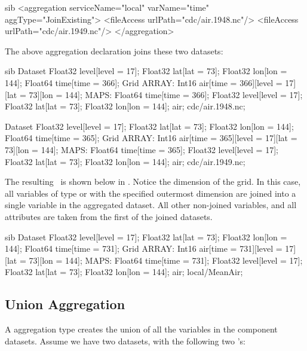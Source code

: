 \documentclass{dods-book}
\begin{document}
\begin{vcode}{sib}
<aggregation serviceName="local" varName="time" 
    aggType="JoinExisting">
  <fileAccess urlPath="cdc/air.1948.nc"/>
  <fileAccess urlPath="cdc/air.1949.nc"/>
</aggregation>
\end{vcode}

The above aggregation declaration joins these two datasets:

\begin{vcode}{sib}
Dataset {
  Float32 level[level = 17];
  Float32 lat[lat = 73];
  Float32 lon[lon = 144];
  Float64 time[time = 366];
  Grid {
    ARRAY:
      Int16 air[time = 366][level = 17][lat = 73][lon = 144];
    MAPS:
      Float64 time[time = 366];
      Float32 level[level = 17];
      Float32 lat[lat = 73];
      Float32 lon[lon = 144];
  } air;
} cdc/air.1948.nc;

Dataset {
  Float32 level[level = 17];
  Float32 lat[lat = 73];
  Float32 lon[lon = 144];
  Float64 time[time = 365];
  Grid {
    ARRAY:
      Int16 air[time = 365][level = 17][lat = 73][lon = 144];
    MAPS:
      Float64 time[time = 365];
      Float32 level[level = 17];
      Float32 lat[lat = 73];
      Float32 lon[lon = 144];
  } air;
} cdc/air.1949.nc;
\end{vcode}

The resulting \dds\ is shown below in .  Notice the
 dimension of the  grid.  In this case, all
variables of type  or with the specified
outermost dimension are joined into a single variable in the
aggregated dataset.  All other non-joined variables, and all
attributes are taken from the first of the joined datasets.

\begin{vcode}{sib}
Dataset {
  Float32 level[level = 17];
  Float32 lat[lat = 73];
  Float32 lon[lon = 144];
  Float64 time[time = 731];
  Grid {
    ARRAY:
      Int16 air[time = 731][level = 17][lat = 73][lon = 144];
    MAPS:
      Float64 time[time = 731];
      Float32 level[level = 17];
      Float32 lat[lat = 73];
      Float32 lon[lon = 144];
  } air;
} local/MeanAir;
\end{vcode}

\subsection{Union Aggregation}
\label{agg,union}

A  aggregation type creates the union of all the
variables in the component datasets.  Assume we have two datasets,
with the following two \dds 's:
\end{document}
